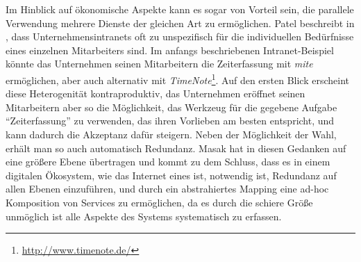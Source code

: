 Im Hinblick auf ökonomische Aspekte kann es sogar von Vorteil sein, die parallele Verwendung mehrere Dienste der gleichen Art zu ermöglichen. Patel beschreibt in \cite[S.29]{pl-depintra}, dass Unternehmensintranets oft zu unspezifisch für die individuellen Bedürfnisse eines einzelnen Mitarbeiters sind. Im anfangs beschriebenen Intranet-Beispiel könnte das Unternehmen seinen Mitarbeitern die Zeiterfassung mit \emph{mite} ermöglichen, aber auch alternativ mit \emph{TimeNote}\footnote{\url{http://www.timenote.de/}}. Auf den ersten Blick erscheint diese Heterogenität kontraproduktiv, das Unternehmen eröffnet seinen Mitarbeitern aber so die Möglichkeit, das Werkzeug für die gegebene Aufgabe "`Zeiterfassung"' zu verwenden, das ihren  Vorlieben am besten entspricht, und kann dadurch die Akzeptanz dafür steigern. Neben der Möglichkeit der Wahl, erhält man so auch automatisch Redundanz. Masak hat in \cite[S.236ff]{mkdigioe} diesen Gedanken auf eine größere Ebene übertragen und kommt zu dem Schluss, dass es in einem digitalen Ökosystem, wie das Internet eines ist, notwendig ist, Redundanz auf allen Ebenen einzuführen, und durch ein abstrahiertes Mapping eine ad-hoc Komposition von Services zu ermöglichen, da es durch die schiere Größe unmöglich ist alle Aspekte des Systems systematisch zu erfassen.
